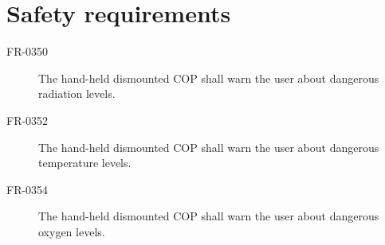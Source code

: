 \section{Safety requirements}

\begin{description}
\item[FR-0350] The hand-held dismounted COP shall warn the user about dangerous radiation levels.
\item[FR-0352] The hand-held dismounted COP shall warn the user about dangerous temperature levels.
\item[FR-0354] The hand-held dismounted COP shall warn the user about dangerous oxygen levels.
\end{description}